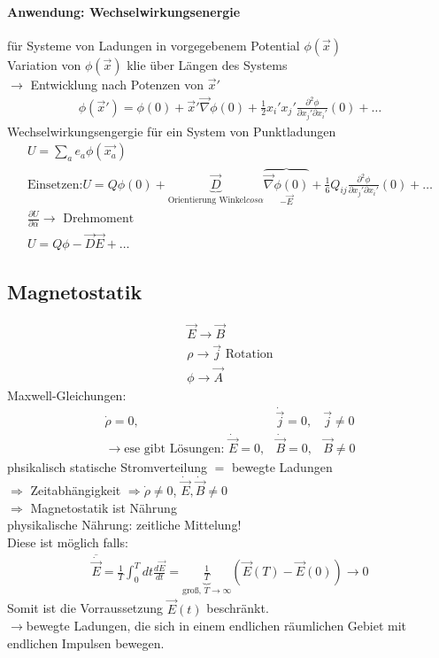 \documentclass[a4paper]{article}
\begin{document}
\paragraph{Anwendung: Wechselwirkungsenergie}
für Systeme von Ladungen in vorgegebenem Potential $\phi(\vec{x})$\\
Variation von $\phi(\vec{x})$ klie über Längen des Systems\\
$\rightarrow$ Entwicklung nach Potenzen von $\vec{x}'$\\
\begin{align}
\phi(\vec{x}')=\phi(0)+\vec{x}'\vec{\nabla}\phi(0)+\frac{1}{2}x_i'x_j'
\frac{\partial^2\phi}{\partial x_j'\partial x_i'}(0)+\ldots
\end{align}
Wechselwirkungsengergie für ein System von Punktladungen
\begin{align}
U=\sum_a e_a\phi(\vec{x_a})\\
\text{Einsetzen:}
U=Q\phi(0)+\underbrace{\vec{D}}_{\text{Orientierung Winkel}cos\alpha}
\overbrace{\vec{\nabla}\phi(0)}_{-\vec{E}}+ \frac{1}{6}Q_{ij}\frac{\partial^2\phi}{\partial x_j'\partial x_i'}(0)+\ldots\\
\frac{\partial U}{\partial\alpha}\rightarrow \text{ Drehmoment}\\
U=Q\phi-\vec{D}\vec{E}+\ldots
\end{align}
\subsection{Magnetostatik}
\begin{align}
\vec{E}\rightarrow\vec{B}\\
\rho\rightarrow\vec{j} \text{    Rotation}\\
\phi\rightarrow\vec{A}
\end{align}
Maxwell-Gleichungen:
\begin{align}
\dot{\rho}=0, & \dot{\vec{j}}=0, & \vec{j}\neq0\\
\rightarrow \text{ese gibt Lösungen: } \dot{\vec{E}}=0, &\dot{\vec{B}}=0,
&\vec{B}\neq0
\end{align}
phsikalisch statische Stromverteilung $=$ bewegte Ladungen\\
$\Rightarrow$ Zeitabhängigkeit $\Rightarrow \dot{\rho}\neq0$, 
$\dot{\vec{E}},\dot{\vec{B}}\neq0$\\
$\Rightarrow$ Magnetostatik ist Nährung\\
physikalische Nährung: zeitliche Mittelung!\\
Diese ist möglich falls:
\begin{align}
\overline{\dot{\vec{E}}}=\frac{1}{T}\int_0^T dt
\frac{d\vec{E}}{dt}=\underbrace{\frac{1}{T}}_{\text{groß, }T\rightarrow\infty}
\left( \vec{E}(T)-\vec{E}(0) \right)\rightarrow0
\end{align}
Somit ist die Vorraussetzung $\vec{E}(t)$ beschränkt.\\
$\rightarrow$bewegte Ladungen, die sich in einem endlichen räumlichen Gebiet mit
endlichen Impulsen bewegen.
\end{document}
